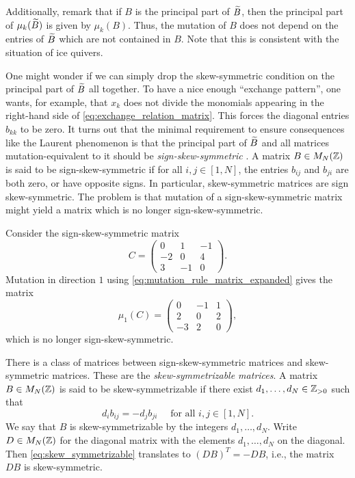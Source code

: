 Additionally, remark that if $B$ is the principal part of $\widetilde{B}$, then the principal
part of $\mu_k(\widetilde{B})$ is given by $\mu_k(B)$. Thus, the mutation of $B$ does not depend
on the entries of $\widetilde{B}$ which are not contained in $B$. Note that this is consistent with the situation of ice quivers.

One might wonder if we can simply drop the skew-symmetric condition on the principal
part of $\widetilde{B}$ all together. To have a nice enough ``exchange
pattern'', one wants, for example, that $x_k$ does not divide the monomials appearing in the right-hand side of \cref{eq:exchange_relation_matrix}. This forces the diagonal entries $b_{kk}$ to be zero. It turns out that the minimal requirement to ensure consequences like the Laurent phenomenon is that the principal part of $\widetilde{B}$ and all matrices
mutation-equivalent to it should be \emph{sign-skew-symmetric}
\parencite[Proposition 4.3]{FominZelevinsky2002CAF}. A matrix $B \in M_N(\mathbb{Z})$ is said to
be sign-skew-symmetric if for all $i,j \in [1, N]$, the entries $b_{ij}$ and $b_{ji}$
are both zero, or have opposite signs. In particular, skew-symmetric matrices are sign
skew-symmetric. The problem is that mutation of a sign-skew-symmetric matrix might
yield a matrix which is no longer sign-skew-symmetric.

\begin{example}
	Consider the sign-skew-symmetric matrix
	\begin{equation*}
		C = \begin{pmatrix}
			0  & 1  & -1 \\
			-2 & 0  & 4  \\
			3  & -1 & 0
		\end{pmatrix}.
	\end{equation*}
	Mutation in direction $1$ using \cref{eq:mutation_rule_matrix_expanded} gives the
	matrix
	\begin{equation*}
		\mu_1(C) = \begin{pmatrix}
			0  & -1 & 1 \\
			2  & 0  & 2 \\
			-3 & 2  & 0
		\end{pmatrix},
	\end{equation*}
	which is no longer sign-skew-symmetric.
\end{example}

There is a class of matrices between sign-skew-symmetric matrices and skew-symmetric
matrices. These are the \emph{skew-symmetrizable
	matrices}. A matrix $B \in M_N(\mathbb{Z})$ is said to be
skew-symmetrizable if there exist $d_1, \dots, d_N \in \mathbb{Z}_{> 0}$ such that
\begin{equation}\label{eq:skew_symmetrizable}
	d_i b_{ij} = -d_j b_{ji}\quad  \text{ for all } i,j \in [1, N].
\end{equation}
%
We say that $B$ is skew-symmetrizable by the integers $d_1, \dots, d_N$. Write $D \in
	M_N(\mathbb{Z})$ for the diagonal matrix with the elements $d_1, \dots, d_N$ on the diagonal.
Then \cref{eq:skew_symmetrizable} translates to $(DB)^T = -DB$, i.e., the matrix $DB$
is skew-symmetric.

